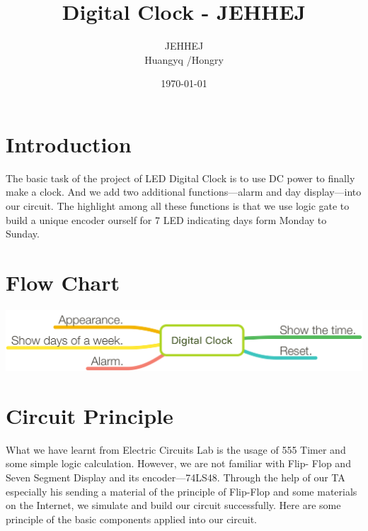 \documentclass[12pt]{article}
\title{Digital Clock - JEHHEJ}
\author{JEHHEJ\\ Huangyq /Hongry }
\date{\today}
\begin{document}
\maketitle

\tableofcontents
\clearpage

\section{Introduction}
	The basic task of the project of LED
Digital Clock is to use DC power to 
finally make a clock. And we add two
additional functions—alarm and day 
display—into our circuit. The highlight 
among all these functions is that we use
logic gate to build a unique encoder 
ourself for 7 LED indicating days form 
Monday to Sunday.
\section{Flow Chart}
\includegraphics[scale=0.75]{workflow}


\section{Circuit Principle}
What we have learnt from Electric 
Circuits Lab is the usage of 555 Timer 
and some simple logic calculation. 
However, we are not familiar with Flip-
Flop and Seven Segment Display and its 
encoder—74LS48. Through the help of our 
TA especially his sending a material of 
the principle of Flip-Flop and some 
materials on the Internet, we simulate 
and build our circuit successfully. Here 
are some principle of the basic 
components applied into our circuit.
\end{document}
